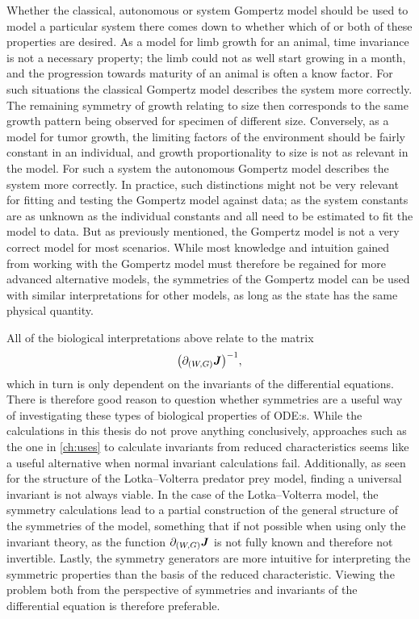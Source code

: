 Whether the classical, autonomous or system Gompertz model should be used to model a particular system there comes down to whether which of or both of these properties are desired.
As a model for limb growth for an animal, time invariance is not a necessary property; the limb could not as well start growing in a month, and the progression towards maturity of an animal is often a know factor.
For such situations the classical Gompertz model describes the system more correctly.
The remaining symmetry of growth relating to size then corresponds to the same growth pattern being observed for specimen of different size.
Conversely, as a model for tumor growth, the limiting factors of the environment should be fairly constant in an individual, and growth proportionality to size is not as relevant in the model.
For such a system the autonomous Gompertz model describes the system more correctly.
In practice, such distinctions might not be very relevant for fitting and testing the Gompertz model against data; as the system constants are as unknown as the individual constants and all need to be estimated to fit the model to data.
But as previously mentioned, the Gompertz model is not a very correct model for most scenarios.
While most knowledge and intuition gained from working with the Gompertz model must therefore be regained for more advanced alternative models, the symmetries of the Gompertz model can be used with similar interpretations for other models, as long as the state has the same physical quantity.

All of the biological interpretations above relate to the matrix
\begin{equation*}
  \left(\partial_{(W, G)} \vect{J}\right)^{-1},
\end{equation*}
which in turn is only dependent on the invariants of the differential equations.
There is therefore good reason to question whether symmetries are a useful way of investigating these types of biological properties of ODE:s.
While the calculations in this thesis do not prove anything conclusively, approaches such as the one in \cref{ch:uses} to calculate invariants from reduced characteristics seems like a useful alternative when normal invariant calculations fail.
Additionally, as seen for the structure of the Lotka--Volterra predator prey model, finding a universal invariant is not always viable.
In the case of the Lotka--Volterra model, the symmetry calculations lead to a partial construction of the general structure of the symmetries of the model, something that if not possible when using only the invariant theory, as the function \(\partial_{(W, G)} \boldsymbol{J}\) is not fully known and therefore not invertible.
Lastly, the symmetry generators are more intuitive for interpreting the symmetric properties than the basis of the reduced characteristic.
Viewing the problem both from the perspective of symmetries and invariants of the differential equation is therefore preferable.

